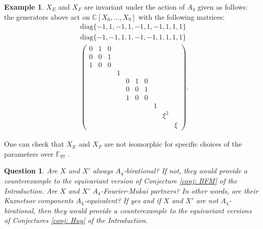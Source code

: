 \documentclass[11pt]{amsart}
\theoremstyle{plain}
\newtheorem{question}[theorem]{Question}
\numberwithin{equation}{section}
\theoremstyle{definition}
\newtheorem{example}[theorem]{Example}
\theoremstyle{remark}
\newcommand{\C}{\mathbb C}
\newcommand{\diag}{\mathrm{diag}}
\begin{document}
\begin{example}
$X_E$ and $X_F$ are invariant under the action of $A_4$ given as follows: the generators above act on $\C[X_0,\dots,X_9]$ with the following matrices:
\begin{align*}
	&\diag\{-1,1,-1,1,-1,1,-1,1,1,1\} \\
	&\diag\{-1,-1,1,1,-1,-1,1,1,1,1\} \\
       	&\begin{pmatrix}
	   0&1&0&\\
       0&0&1\\
       1&0&0\\
       &&&1\\
       &&&&0&1&0\\
       &&&&0&0&1\\
       &&&&1&0&0\\
       &&&&&&&1&&\\
       &&&&&&&&\xi^2&\\
       &&&&&&&&&\xi
       \end{pmatrix}.
\end{align*}

 One can check that $X_E$ and $X_F$ are not isomorphic for specific choices of the parameters over $\mathbb{F}_{97}$ \cite[Example8.5.m2]{MacaulayFiles}.
\end{example}

\begin{question}
Are $X$ and $X'$ always $A_4$-birational? If not, they would provide a counterexample to the equivariant version of Conjecture \ref{conj: BFM} of the Introduction. Are $X$ and $X'$ $A_4$-Fourier-Mukai partners? In other words, are their Kuznetsov components $A_4$-equivalent? If yes and if $X$ and $X'$ are not $A_4$-birational, then they would provide a counterexample to the equivariant versions of Conjectures \ref{conj: Huy} of the Introduction. 
\end{question}







\end{document}
